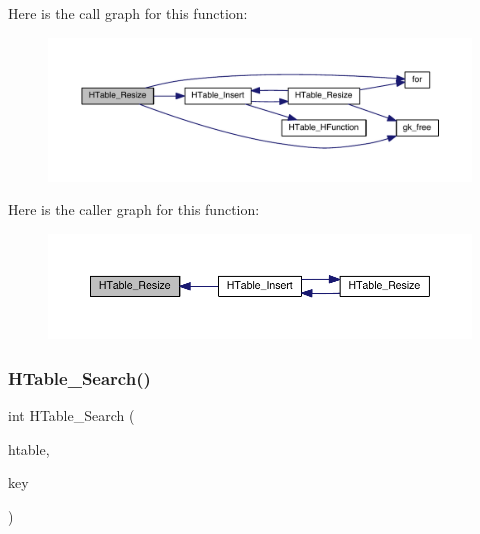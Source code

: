 Here is the call graph for this function\+:\nopagebreak
\begin{figure}[H]
\begin{center}
\leavevmode
\includegraphics[width=350pt]{a00077_ad79cb786b03a73481fb3e5846d345801_cgraph}
\end{center}
\end{figure}
Here is the caller graph for this function\+:\nopagebreak
\begin{figure}[H]
\begin{center}
\leavevmode
\includegraphics[width=350pt]{a00077_ad79cb786b03a73481fb3e5846d345801_icgraph}
\end{center}
\end{figure}
\mbox{\label{a00077_a2b610fbd6017e0ef2e393c563b4809a5}} 
\subsubsection{\texorpdfstring{H\+Table\+\_\+\+Search()}{HTable\_Search()}}
{\footnotesize\ttfamily int H\+Table\+\_\+\+Search (\begin{DoxyParamCaption}\item[{\hyperlink{a00650}{gk\+\_\+\+H\+Table\+\_\+t} $\ast$}]{htable,  }\item[{int}]{key }\end{DoxyParamCaption})}

